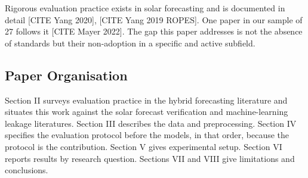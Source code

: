 Rigorous evaluation practice exists in solar forecasting and is
documented in detail [CITE Yang 2020], [CITE Yang 2019 ROPES]. One paper
in our sample of 27 follows it [CITE Mayer 2022]. The gap this paper
addresses is not the absence of standards but their non-adoption in a
specific and active subfield.

\subsection{Paper Organisation}

Section II surveys evaluation practice in the hybrid forecasting
literature and situates this work against the solar forecast
verification and machine-learning leakage literatures. Section III
describes the data and preprocessing. Section IV specifies the
evaluation protocol before the models, in that order, because the
protocol is the contribution. Section V gives experimental setup.
Section VI reports results by research question. Sections VII and VIII
give limitations and conclusions.
